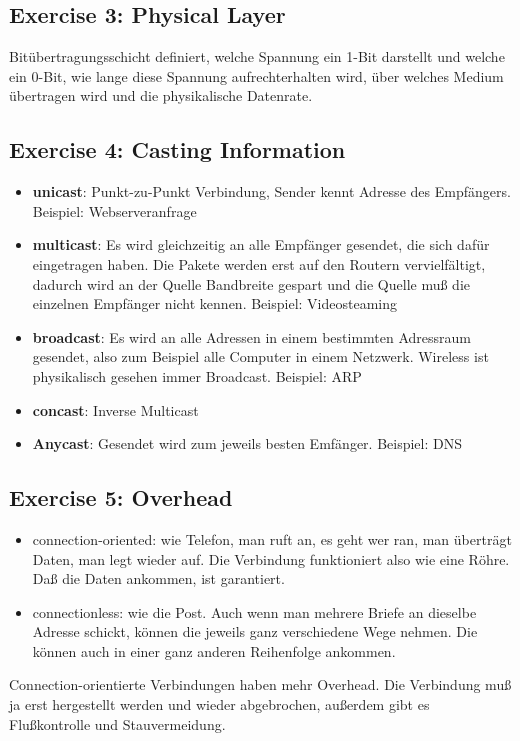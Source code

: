 \documentclass[10pt,a4paper]{scrartcl}
\begin{document}
\subsection*{Exercise 3: Physical Layer}
Bitübertragungsschicht definiert, welche Spannung ein 1-Bit darstellt und welche ein 0-Bit, wie lange diese Spannung aufrechterhalten wird, über welches Medium übertragen wird und die physikalische Datenrate.

\subsection*{Exercise 4: Casting Information}
\begin{itemize}
\item \textbf{unicast}: Punkt-zu-Punkt Verbindung, Sender kennt Adresse des Empfängers. Beispiel: Webserveranfrage
\item \textbf{multicast}: Es wird gleichzeitig an alle Empfänger gesendet, die sich dafür eingetragen haben. Die Pakete werden erst auf den Routern vervielfältigt, dadurch wird an der Quelle Bandbreite gespart und die Quelle muß die einzelnen Empfänger nicht kennen. Beispiel: Videosteaming
\item \textbf{broadcast}: Es wird an alle Adressen in einem bestimmten Adressraum gesendet, also zum Beispiel alle Computer in einem Netzwerk. Wireless ist physikalisch gesehen immer Broadcast. Beispiel: ARP
\item \textbf{concast}: Inverse Multicast
\item \textbf{Anycast}: Gesendet wird zum jeweils besten Emfänger. Beispiel: DNS
\end{itemize}

\subsection*{Exercise 5: Overhead}
\begin{itemize}
\item connection-oriented: wie Telefon, man ruft an, es geht wer ran, man überträgt Daten, man legt wieder auf. Die Verbindung funktioniert also wie eine Röhre. Daß die Daten ankommen, ist garantiert.
\item connectionless: wie die Post. Auch wenn man mehrere Briefe an dieselbe Adresse schickt, können die jeweils ganz verschiedene Wege nehmen. Die können auch in einer ganz anderen Reihenfolge ankommen. 
\end{itemize}
Connection-orientierte Verbindungen haben mehr Overhead. Die Verbindung muß ja erst hergestellt werden und wieder abgebrochen, außerdem gibt es Flußkontrolle und Stauvermeidung.
\end{document}
